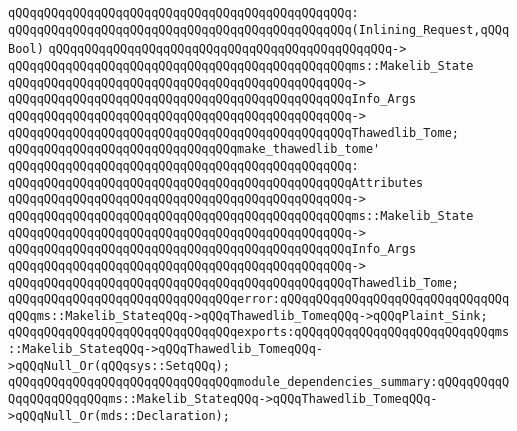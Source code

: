 \verb|qQQqqQQqqQQqqQQqqQQqqQQqqQQqqQQqqQQqqQQqqQQqqQQq:|\newline
\verb|qQQqqQQqqQQqqQQqqQQqqQQqqQQqqQQqqQQqqQQqqQQqqQQq(Inlining_Request,qQQqBool)|\newline
\verb|qQQqqQQqqQQqqQQqqQQqqQQqqQQqqQQqqQQqqQQqqQQqqQQq->|\newline
\verb|qQQqqQQqqQQqqQQqqQQqqQQqqQQqqQQqqQQqqQQqqQQqqQQqms::Makelib_State|\newline
\verb|qQQqqQQqqQQqqQQqqQQqqQQqqQQqqQQqqQQqqQQqqQQqqQQq->|\newline
\verb|qQQqqQQqqQQqqQQqqQQqqQQqqQQqqQQqqQQqqQQqqQQqqQQqInfo_Args|\newline
\verb|qQQqqQQqqQQqqQQqqQQqqQQqqQQqqQQqqQQqqQQqqQQqqQQq->|\newline
\verb|qQQqqQQqqQQqqQQqqQQqqQQqqQQqqQQqqQQqqQQqqQQqqQQqThawedlib_Tome;|\newline
\newline
\verb|qQQqqQQqqQQqqQQqqQQqqQQqqQQqqQQqmake_thawedlib_tome'|\newline
\verb|qQQqqQQqqQQqqQQqqQQqqQQqqQQqqQQqqQQqqQQqqQQqqQQq:|\newline
\verb|qQQqqQQqqQQqqQQqqQQqqQQqqQQqqQQqqQQqqQQqqQQqqQQqAttributes|\newline
\verb|qQQqqQQqqQQqqQQqqQQqqQQqqQQqqQQqqQQqqQQqqQQqqQQq->|\newline
\verb|qQQqqQQqqQQqqQQqqQQqqQQqqQQqqQQqqQQqqQQqqQQqqQQqms::Makelib_State|\newline
\verb|qQQqqQQqqQQqqQQqqQQqqQQqqQQqqQQqqQQqqQQqqQQqqQQq->|\newline
\verb|qQQqqQQqqQQqqQQqqQQqqQQqqQQqqQQqqQQqqQQqqQQqqQQqInfo_Args|\newline
\verb|qQQqqQQqqQQqqQQqqQQqqQQqqQQqqQQqqQQqqQQqqQQqqQQq->|\newline
\verb|qQQqqQQqqQQqqQQqqQQqqQQqqQQqqQQqqQQqqQQqqQQqqQQqThawedlib_Tome;|\newline
\newline
\verb|qQQqqQQqqQQqqQQqqQQqqQQqqQQqqQQqerror:qQQqqQQqqQQqqQQqqQQqqQQqqQQqqQQqqQQqms::Makelib_StateqQQq->qQQqThawedlib_TomeqQQq->qQQqPlaint_Sink;|\newline
\verb|qQQqqQQqqQQqqQQqqQQqqQQqqQQqqQQqexports:qQQqqQQqqQQqqQQqqQQqqQQqqQQqms::Makelib_StateqQQq->qQQqThawedlib_TomeqQQq->qQQqNull_Or(qQQqsys::SetqQQq);|\newline
\newline
\verb|qQQqqQQqqQQqqQQqqQQqqQQqqQQqqQQqmodule_dependencies_summary:qQQqqQQqqQQqqQQqqQQqqQQqms::Makelib_StateqQQq->qQQqThawedlib_TomeqQQq->qQQqNull_Or(mds::Declaration);|\newline
